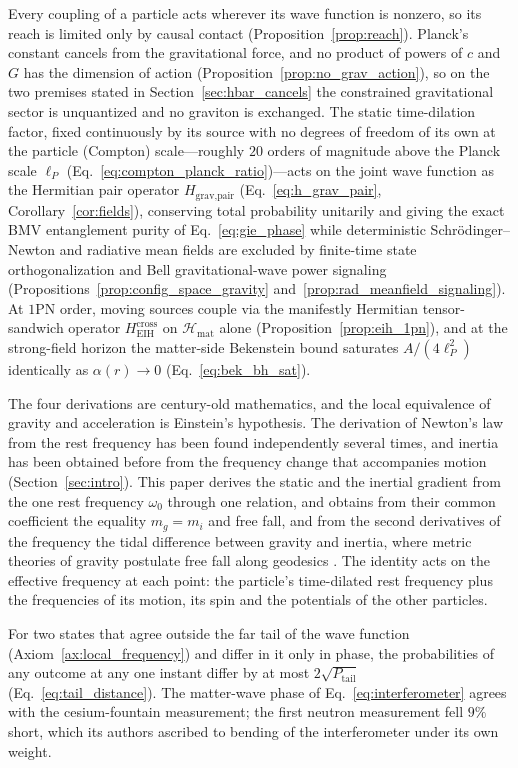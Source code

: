 \documentclass[aps,prd,onecolumn,tightenlines,nofootinbib,notitlepage,11pt,floatfix]{revtex4-2}
\theoremstyle{indentedtheorem}
\begin{document}
Every coupling of a particle acts wherever its wave function is nonzero, so its reach is limited only by causal contact (Proposition~\ref{prop:reach}). Planck's constant cancels from the gravitational force, and no product of powers of $c$ and $G$ has the dimension of action (Proposition~\ref{prop:no_grav_action}), so on the two premises stated in Section~\ref{sec:hbar_cancels} the constrained gravitational sector is unquantized and no graviton is exchanged. The static time-dilation factor, fixed continuously by its source with no degrees of freedom of its own at the particle (Compton) scale—roughly $20$ orders of magnitude above the Planck scale $\ell_P$ (Eq.~\eqref{eq:compton_planck_ratio})—acts on the joint wave function as the Hermitian pair operator $H_\text{grav,pair}$ (Eq.~\eqref{eq:h_grav_pair}, Corollary~\ref{cor:fields}), conserving total probability unitarily and giving the exact BMV entanglement purity of Eq.~\eqref{eq:gie_phase} while deterministic Schr\"odinger--Newton and radiative mean fields are excluded by finite-time state orthogonalization and Bell gravitational-wave power signaling (Propositions~\ref{prop:config_space_gravity} and~\ref{prop:rad_meanfield_signaling}). At $1$PN order, moving sources couple via the manifestly Hermitian tensor-sandwich operator $H_\text{EIH}^\text{cross}$ on $\mathcal{H}_\text{mat}$ alone (Proposition~\ref{prop:eih_1pn}), and at the strong-field horizon the matter-side Bekenstein bound saturates $A/(4\ell_P^2)$ identically as $\alpha(r)\to 0$ (Eq.~\eqref{eq:bek_bh_sat}).

The four derivations are century-old mathematics, and the local equivalence of gravity and acceleration is Einstein's hypothesis. The derivation of Newton's law from the rest frequency has been found independently several times, and inertia has been obtained before from the frequency change that accompanies motion (Section~\ref{sec:intro}). This paper derives the static and the inertial gradient from the one rest frequency $\omega_0$ through one relation, and obtains from their common coefficient the equality $m_g=m_i$ and free fall, and from the second derivatives of the frequency the tidal difference between gravity and inertia, where metric theories of gravity postulate free fall along geodesics \citep{Will2014Confrontation}. The identity acts on the effective frequency at each point: the particle's time-dilated rest frequency plus the frequencies of its motion, its spin and the potentials of the other particles.

For two states that agree outside the far tail of the wave function (Axiom~\ref{ax:local_frequency}) and differ in it only in phase, the probabilities of any outcome at any one instant differ by at most $2\sqrt{P_\text{tail}}$ (Eq.~\eqref{eq:tail_distance}). The matter-wave phase of Eq.~\eqref{eq:interferometer} agrees with the cesium-fountain measurement; the first neutron measurement fell $9\%$ short, which its authors ascribed to bending of the interferometer under its own weight.
\end{document}
